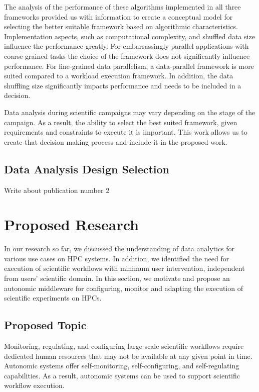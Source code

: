 The analysis of the performance of these algorithms implemented in all three frameworks provided us with information to create a conceptual model for selecting the better suitable framework based on algorithmic characteristics. Implementation aspects, such as computational complexity, and shuffled data size influence the performance greatly. For embarrassingly parallel applications with coarse grained tasks the choice of the framework does not significantly influence performance. For fine-grained data parallelism, a data-parallel framework is more suited compared to a workload execution framework. In addition, the data shuffling size significantly impacts performance and needs to be included in a decision.

Data analysis during scientific campaigns may vary depending on the stage of the campaign. As a result, the ability to select the best suited framework, given requirements and constraints to execute it is important. This work allows us to create that decision making process and include it in the proposed work.

\subsection{Data Analysis Design Selection}

Write about publication number 2

\section{Proposed Research}

In our research so far, we discussed the understanding of data analytics for various use cases on HPC systems. In addition, we identified the need for execution of scientific workflows with minimum user intervention, independent from users' scientific domain. In this section, we motivate and propose an autonomic middleware for configuring, monitor and adapting the execution of scientific experiments on HPCs.

\subsection{Proposed Topic}

Monitoring, regulating, and configuring large scale scientific workflows require dedicated human resources that may not be available at any given point in time. Autonomic systems offer self-monitoring, self-configuring, and self-regulating capabilities. As a result, autonomic systems can be used to support scientific workflow execution.

